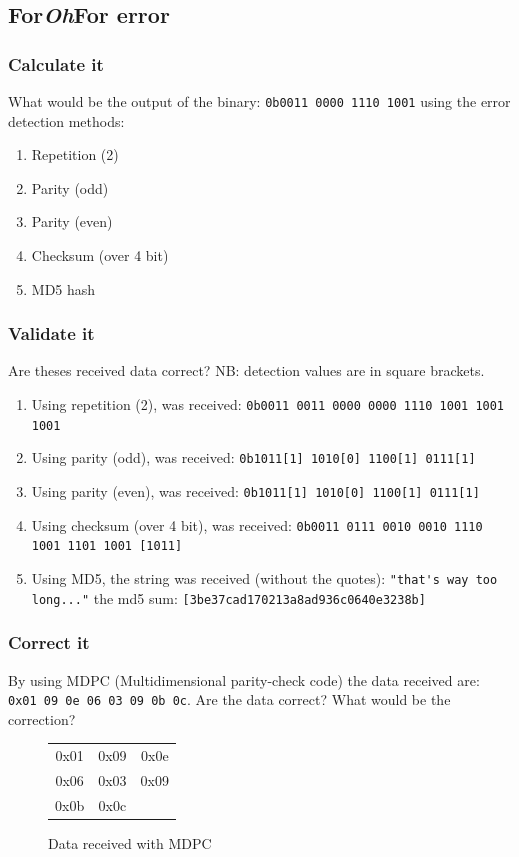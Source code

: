 \documentclass[11pt]{article}
\begin{document}
\subsection{For\emph{Oh}For error}
\subsubsection{Calculate it}
What would be the output of the binary: \verb$0b0011 0000 1110 1001$ using the error detection methods:
  \begin{enumerate}
    \item Repetition (2)
    \item Parity (odd)
    \item Parity (even)
    \item Checksum (over 4 bit)
    \item MD5 hash
  \end{enumerate}

\subsubsection{Validate it}
Are theses received data correct? NB: detection values are in square brackets.
  \begin{enumerate}
    \item Using repetition (2), was received: \verb$0b0011 0011 0000 0000 1110 1001 1001 1001$
    \item Using parity (odd), was received: \verb$0b1011[1] 1010[0] 1100[1] 0111[1]$
    \item Using parity (even), was received: \verb$0b1011[1] 1010[0] 1100[1] 0111[1]$
    \item Using checksum (over 4 bit), was received: \verb$0b0011 0111 0010 0010 1110 1001 1101 1001 [1011]$
    \item Using MD5, the string was received (without the quotes): \verb$"that's way too long..."$ the md5 sum: \verb$[3be37cad170213a8ad936c0640e3238b]$
  \end{enumerate}


\subsubsection{Correct it}
By using MDPC (Multidimensional parity-check code) the data received are: \verb$0x01 09 0e 06 03 09 0b 0c$. Are the data correct? What would be the correction? \\
  \begin{figure}[h]
    \centering
    \begin{tabular}{cc|c}
      0x01 & 0x09 & 0x0e \\
      0x06 & 0x03 & 0x09 \\ \hline
      0x0b & 0x0c &
    \end{tabular}
    \caption{Data received with MDPC}
    \label{fig:ami}
  \end{figure}
\end{document}
